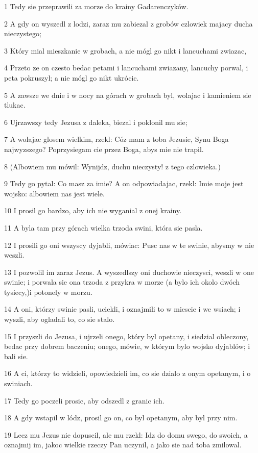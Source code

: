 \par 1 Tedy sie przeprawili za morze do krainy Gadarenczyków.
\par 2 A gdy on wyszedl z lodzi, zaraz mu zabiezal z grobów czlowiek majacy ducha nieczystego;
\par 3 Który mial mieszkanie w grobach, a nie mógl go nikt i lancuchami zwiazac,
\par 4 Przeto ze on czesto bedac petami i lancuchami zwiazany, lancuchy porwal, i peta pokruszyl; a nie mógl go nikt ukrócic.
\par 5 A zawsze we dnie i w nocy na górach w grobach byl, wolajac i kamieniem sie tlukac.
\par 6 Ujrzawszy tedy Jezusa z daleka, biezal i poklonil mu sie;
\par 7 A wolajac glosem wielkim, rzekl: Cóz mam z toba Jezusie, Synu Boga najwyzszego? Poprzysiegam cie przez Boga, abys mie nie trapil.
\par 8 (Albowiem mu mówil: Wynijdz, duchu nieczysty! z tego czlowieka.)
\par 9 Tedy go pytal: Co masz za imie? A on odpowiadajac, rzekl: Imie moje jest wojsko: albowiem nas jest wiele.
\par 10 I prosil go bardzo, aby ich nie wyganial z onej krainy.
\par 11 A byla tam przy górach wielka trzoda swini, która sie pasla.
\par 12 I prosili go oni wszyscy dyjabli, mówiac: Pusc nas w te swinie, abysmy w nie weszli.
\par 13 I pozwolil im zaraz Jezus. A wyszedlszy oni duchowie nieczysci, weszli w one swinie; i porwala sie ona trzoda z przykra w morze (a bylo ich okolo dwóch tysiecy,)i potonely w morzu.
\par 14 A oni, którzy swinie pasli, uciekli, i oznajmili to w miescie i we wsiach; i wyszli, aby ogladali to, co sie stalo.
\par 15 I przyszli do Jezusa, i ujrzeli onego, który byl opetany, i siedzial obleczony, bedac przy dobrem baczeniu; onego, mówie, w którym bylo wojsko dyjablów; i bali sie.
\par 16 A ci, którzy to widzieli, opowiedzieli im, co sie dzialo z onym opetanym, i o swiniach.
\par 17 Tedy go poczeli prosic, aby odszedl z granic ich.
\par 18 A gdy wstapil w lódz, prosil go on, co byl opetanym, aby byl przy nim.
\par 19 Lecz mu Jezus nie dopuscil, ale mu rzekl: Idz do domu swego, do swoich, a oznajmij im, jakoc wielkie rzeczy Pan uczynil, a jako sie nad toba zmilowal.
